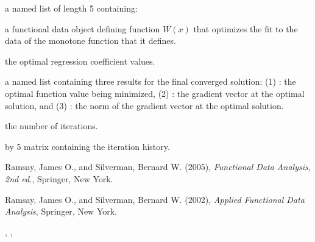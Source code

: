 \begin{Value}
a named list of length 5 containing:

\begin{ldescription}
\item[\code{Wfdobj}] a functional data object defining function $W(x)$ that optimizes the fit
to the data of the monotone function that it defines. 

\item[\code{beta}] the optimal regression coefficient values.

\item[\code{Flist}] a named list containing three results for the final converged solution:
(1)
: the optimal function value being minimized,
(2)
: the gradient vector at the optimal solution,   and
(3)
: the norm of the gradient vector at the optimal solution.

\item[\code{iternum}] the number of iterations.

\item[\code{iterhist}]  by 5 matrix containing the iteration
history.

\end{ldescription}
\end{Value}
\begin{References}\relax
Ramsay, James O., and Silverman, Bernard W. (2005), \emph{Functional 
Data Analysis, 2nd ed.}, Springer, New York. 

Ramsay, James O., and Silverman, Bernard W. (2002), \emph{Applied
Functional Data Analysis}, Springer, New York.
\end{References}
\begin{SeeAlso}\relax
{}, 
, 
\end{SeeAlso}
